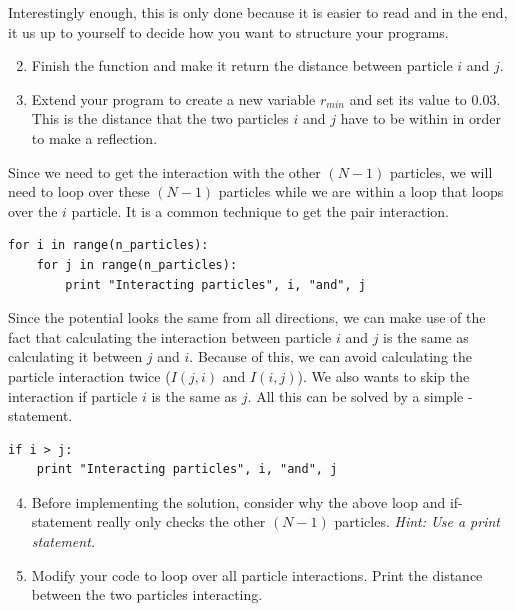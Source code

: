 \documentclass{article}
\begin{document}
Interestingly enough, this is only done because it is easier to read and in
the end, it us up to yourself to decide how you want to structure your
programs.

\begin{enumerate}
  \setcounter{enumi}{1}
  \item Finish the function  and make it return
    the distance  between particle $i$ and $j$.

  \item Extend your program to create a new variable $r_{min}$ and set its
    value to 0.03.
    This is the distance that the two particles $i$ and $j$ have to be within
    in order to make a reflection.


\end{enumerate}

Since we need to get the interaction with the other $(N-1)$ particles,
we will need to loop over these $(N-1)$ particles while we are within a loop
that loops over the $i$ particle.
It is a common technique to get the pair interaction.

\begin{lstlisting}
for i in range(n_particles):
    for j in range(n_particles):
        print "Interacting particles", i, "and", j
\end{lstlisting}

Since the potential looks the same from all directions, we can make use of the
fact that calculating the interaction between particle $i$ and $j$ is the same
as calculating it between $j$ and $i$.
Because of this, we can avoid calculating the particle interaction twice ($I(j,
i)$ and $I(i, j)$).  We also wants to skip the interaction if particle $i$ is
the same as $j$.
All this can be solved by a simple -statement.

\begin{lstlisting}
if i > j:
    print "Interacting particles", i, "and", j

\end{lstlisting}

\begin{enumerate}
  \setcounter{enumi}{3}
  \item Before implementing the solution, consider why the above loop and
    if-statement really only checks the other $(N-1)$ particles. {\em Hint: Use
    a print statement.}

  \item Modify your code to loop over all particle interactions. Print the
    distance between the two particles interacting.

\end{enumerate}
\end{document}

